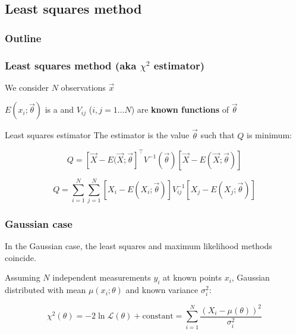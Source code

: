 \documentclass[9pt]{beamer}
\newif\ifmyhide
\newcommand\myhide[1]{%
\ifmyhide \vspace{15pt} \begin{center} \myexample{(blackboard)}\end{center} \vspace{15pt} \else #1 \fi
}
\begin{document}
\subsection{Least squares method}

\begin{frame}
 \frametitle{Outline}
 
 \tableofcontents[current]
\end{frame}

\begin{frame}
 \frametitle{Least squares method (aka $\chi^2$ estimator)}
 
 We consider $N$ observations $\vec{x}$
 
 $E(x_i;\vec{\theta})$ is a  and $V_{ij}$ ($i,j = 1\dots N$) are \textbf{known functions} of $\vec{\theta}$
 
 \myhide{
 \begin{block}{Least squares estimator}
 The estimator is the value $\vec{\theta}$ such that $Q$ is minimum:
 
  $$Q = \left[ \vec{X} - E(\vec{X};\vec{\theta}\right]^\intercal V^{-1} (\vec{\theta}) \left[ \vec{X} - E(\vec{X};\vec{\theta}) \right]$$
  
  $$Q = \sum_{i=1}^N \sum_{j=1}^N \left[ X_i - E(X_i;\vec{\theta})\right] V^{-1}_{ij} \left[ X_j - E(X_j;\vec{\theta})\right]$$
 \end{block}
 }
 

\end{frame}

\begin{frame}
 \frametitle{Gaussian case}
 
 In the Gaussian case, the least squares and maximum likelihood methods coincide. 
 
 Assuming $N$ independent measurements $y_i$ at known points $x_i$, Gaussian distributed with mean
 $\mu(x_i;\theta)$ and known variance $\sigma_i^2$:
 
 $$\chi^2(\theta) = -2\ln\mathcal{L}(\theta) + \text{constant} = \sum_{i=1}^N \frac{\left(X_i - \mu(\theta)\right)^2}{\sigma_i^2}$$
\end{frame}
\end{document}
